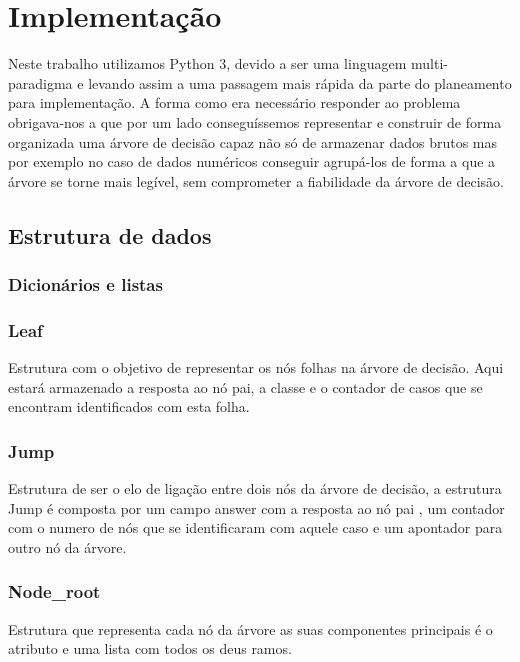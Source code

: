 \documentclass[12pt,a4paper]{article}
\begin{document}
\section{Implementação}
Neste trabalho utilizamos Python 3, devido a ser uma linguagem multi-paradigma e levando assim a uma passagem mais rápida da parte do planeamento para implementação.
A forma como era necessário responder ao problema obrigava-nos a que por um lado conseguíssemos representar e construir de forma organizada uma árvore de decisão capaz não só de armazenar dados brutos mas por exemplo no caso de dados numéricos conseguir agrupá-los de forma a que a árvore se torne mais legível, sem comprometer a fiabilidade da árvore de decisão.  
\subsection{Estrutura de dados}

\subsubsection{Dicionários e listas}


\subsubsection{Leaf}
Estrutura com o objetivo de representar os nós folhas na árvore de decisão. Aqui estará armazenado a resposta ao nó pai, a classe e o contador de casos que se encontram identificados com esta folha.
\subsubsection{Jump}
Estrutura de ser o elo de ligação entre dois nós da árvore  de decisão, a estrutura Jump é composta por um campo answer com a resposta ao nó pai , um contador com o numero de nós que se identificaram com aquele caso e um apontador para outro nó da árvore.
\subsubsection{Node\_root}
Estrutura que representa cada nó da árvore as suas componentes principais é o atributo e uma lista com todos os deus ramos.
\end{document}
